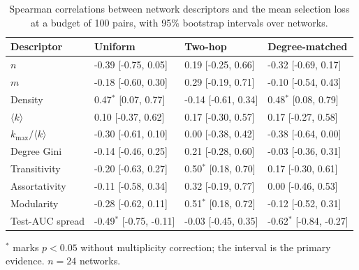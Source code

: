 \begin{table}[htbp]
\centering
\footnotesize
\caption{Spearman correlations between network descriptors and the mean selection loss at a budget of 100 pairs, with 95\% bootstrap intervals over networks.}
\label{tab:structure}
\begin{tabular}{l l l l}
\toprule
Descriptor & Uniform & Two-hop & Degree-matched \\
\midrule
$n$ & -0.39 [-0.75, 0.05] & 0.19 [-0.25, 0.66] & -0.32 [-0.69, 0.17] \\
$m$ & -0.18 [-0.60, 0.30] & 0.29 [-0.19, 0.71] & -0.10 [-0.54, 0.43] \\
Density & 0.47$^{*}$ [0.07, 0.77] & -0.14 [-0.61, 0.34] & 0.48$^{*}$ [0.08, 0.79] \\
$\langle k\rangle$ & 0.10 [-0.37, 0.62] & 0.17 [-0.30, 0.57] & 0.17 [-0.27, 0.58] \\
$k_{\max}/\langle k\rangle$ & -0.30 [-0.61, 0.10] & 0.00 [-0.38, 0.42] & -0.38 [-0.64, 0.00] \\
Degree Gini & -0.14 [-0.46, 0.25] & 0.21 [-0.28, 0.60] & -0.03 [-0.36, 0.31] \\
Transitivity & -0.20 [-0.63, 0.27] & 0.50$^{*}$ [0.18, 0.70] & 0.17 [-0.30, 0.61] \\
Assortativity & -0.11 [-0.58, 0.34] & 0.32 [-0.19, 0.77] & 0.00 [-0.46, 0.53] \\
Modularity & -0.28 [-0.62, 0.11] & 0.51$^{*}$ [0.18, 0.72] & -0.12 [-0.52, 0.31] \\
Test-AUC spread & -0.49$^{*}$ [-0.75, -0.11] & -0.03 [-0.45, 0.35] & -0.62$^{*}$ [-0.84, -0.27] \\
\bottomrule
\end{tabular}
\par\vspace{2pt}\begin{minipage}{\linewidth}\footnotesize $^{*}$ marks $p<0.05$ without multiplicity correction; the interval is the primary evidence. $n=24$ networks.\end{minipage}
\end{table}
